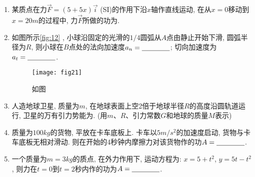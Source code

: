 \begin{enumerate}
\begin{figure}[H]
    \end{figure}
    \item 某质点在力$ \vec{F}=(5+5x)\vec{i}$ (SI)的作用下沿$x$轴作直线运动, 在从$x=0$移动到$x=20m$的过程中, 力$\vec{F}$所做的功为\nl .
    \item 如图所示\ref{fig:12} , 小球沿固定的光滑的$1/4$圆弧从$A$点由静止开始下滑, 圆弧半径为$R$, 则小球在$B$点处的法向加速度$a_n = \nl$; 切向加速度为 $a_t =\nl$. 
    \begin{figure}[H]
        \centering
        \texttt{[image: fig21]}
            \caption{如图}\label{fig:21}
    \end{figure}
    \item 人造地球卫星, 质量为$m$, 在地球表面上空2倍于地球半径$R$的高度沿圆轨道运行, 卫星的万有引力势能为\nl. (用$m$、$R$、引力常数$G$和地球的质量$M$表示)
    \item 质量为$100kg$的货物, 平放在卡车底板上. 卡车以$5m/s^2$的加速度启动, 货物与卡车底板无相对滑动. 则在开始的4秒钟内摩擦力对该货物作的功$A=\nl$.
    \item 一个质量为$m=3kg$的质点, 在外力作用下, 运动方程为: $x=5+t^2$, $y=5t-t^2$, 则力在$t=0$到$t=2$秒内作的功为$A = \nl$.
\end{enumerate}
